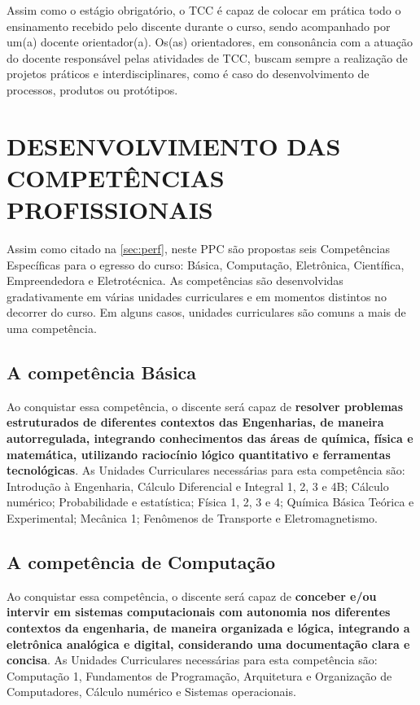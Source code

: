 Assim como o estágio obrigatório, o TCC é capaz de colocar em prática todo o ensinamento recebido pelo discente durante o curso, sendo acompanhado por um(a) docente orientador(a). Os(as) orientadores, em consonância com a atuação do docente responsável pelas atividades de TCC, buscam sempre a realização de projetos práticos e interdisciplinares, como é caso do desenvolvimento de processos, produtos ou protótipos.

\section{DESENVOLVIMENTO DAS COMPETÊNCIAS PROFISSIONAIS}
\label{sec:comp}

Assim como citado na \autoref{sec:perf}, neste PPC são propostas seis Competências Específicas para o egresso do curso: Básica, Computação, Eletrônica, Científica, Empreendedora e Eletrotécnica. As competências são desenvolvidas gradativamente em várias unidades curriculares e em momentos distintos no decorrer do curso. Em alguns casos, unidades curriculares são comuns a mais de uma competência.

\subsection{A competência Básica}

Ao conquistar essa competência, o discente será capaz de \textbf{resolver problemas estruturados de diferentes contextos das Engenharias, de maneira autorregulada, integrando conhecimentos das áreas de química, física e matemática, utilizando raciocínio lógico quantitativo e ferramentas tecnológicas}. As Unidades Curriculares necessárias para esta competência são: Introdução à Engenharia, Cálculo Diferencial e Integral 1, 2, 3 e 4B; Cálculo numérico; Probabilidade e estatística; Física 1, 2, 3 e 4; Química Básica Teórica e Experimental; Mecânica 1; Fenômenos de Transporte e Eletromagnetismo.

\subsection{A competência de Computação}

Ao conquistar essa competência, o discente será capaz de \textbf{conceber e/ou intervir em sistemas computacionais com autonomia nos diferentes contextos da engenharia, de maneira organizada e lógica, integrando a eletrônica analógica e digital, considerando uma documentação clara e concisa}. As Unidades Curriculares necessárias para esta competência são: Computação 1, Fundamentos de Programação, Arquitetura e Organização de Computadores, Cálculo numérico e Sistemas operacionais.

